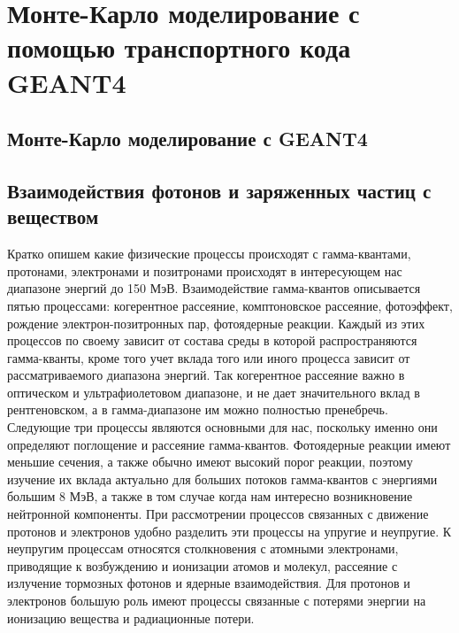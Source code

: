 \chapter{Монте-Карло моделирование с помощью транспортного кода GEANT4}\label{ch:theory}

\section{Монте-Карло моделирование с GEANT4
}\label{sec:theory/geant4}

\section{Взаимодействия фотонов и заряженных частиц с веществом
}\label{sec:theory/propagation}

Кратко опишем какие физические процессы происходят с гамма-квантами, протонами, электронами и позитронами происходят в интересующем нас диапазоне энергий до 150 МэВ. Взаимодействие гамма-квантов описывается пятью процессами: когерентное рассеяние, комптоновское рассеяние, фотоэффект, рождение электрон-позитронных пар, фотоядерные реакции. Каждый из этих процессов по своему зависит от состава среды в которой распространяются гамма-кванты, кроме того учет вклада того или иного процесса зависит от рассматриваемого диапазона энергий. Так когерентное рассеяние важно в оптическом и ультрафиолетовом диапазоне, и не дает значительного вклад в рентгеновском, а в гамма-диапазоне им можно полностью пренебречь. Следующие три процессы являются основными для нас, поскольку именно они определяют поглощение и рассеяние гамма-квантов. Фотоядерные реакции имеют меньшие сечения, а также обычно имеют высокий порог реакции, поэтому изучение их вклада актуально для больших потоков гамма-квантов с энергиями большим 8 МэВ, а также в том случае когда нам интересно возникновение нейтронной компоненты.
При рассмотрении процессов связанных с движение протонов и электронов удобно разделить эти процессы на упругие и неупругие. К неупругим процессам относятся столкновения с атомными электронами, приводящие к возбуждению и ионизации атомов и молекул, рассеяние с излучение тормозных фотонов и ядерные взаимодействия. 
Для протонов и электронов большую роль имеют процессы связанные с потерями энергии на ионизацию вещества и радиационные потери.  



